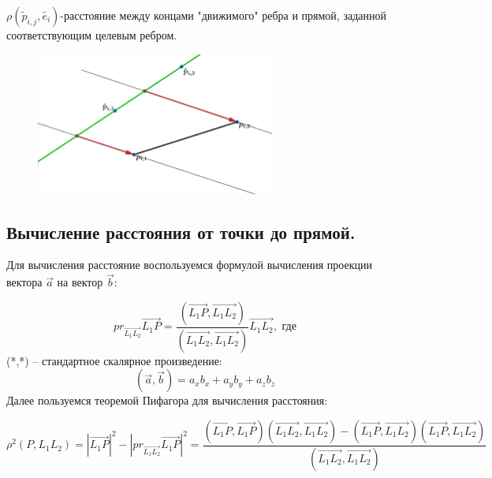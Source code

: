 \documentclass[14pt,fleqn,a4paper]{scrartcl}
\begin{document}
$\rho(\tilde p_{i,j},\widetilde{e_{i}})$-расстояние между концами "движимого" ребра и прямой, заданной соответствующим целевым ребром. 
\begin{figure}[htbp]
\centering
\includegraphics[width=0.7\textwidth]{distancce.png}
\end{figure}
\subsection{Вычисление расстояния от точки до прямой.}

Для вычисления расстояние воспользуемся формулой вычисления проекции вектора $\overrightarrow{a}$ на вектор $\overrightarrow{b}$: \\
\begin{figure} 
\end{figure}
$$pr_{\overrightarrow{L_{1}L_{2}}} \overrightarrow{L_{1}P}=\frac{( \overrightarrow{L_{1}P}, \overrightarrow{L_{1}L_{2}})}{ (\overrightarrow{L_{1}L_{2}}, \overrightarrow{L_{1}L_{2}})} \overrightarrow{L_{1}L_{2}},\text{ где}$$ (*,*) -- стандартное скалярное произведение:
$$( \overrightarrow{a}, \overrightarrow{b})=a_{x}b_{x}+a_{y}b_{y}+a_{z}b_{z}$$
Далее пользуемся теоремой Пифагора для вычисления расстояния:

$$\rho^{2}(P,L_1L_2)=|\overrightarrow{L_{1}P}|^{2}-|pr_{\overrightarrow{L_{1}L_{2}}} \overrightarrow{L_{1}P}|^{2}=\frac{(\overrightarrow{L_{1}P},\overrightarrow{L_{1}P})(\overrightarrow{L_{1}L_{2}},\overrightarrow{L_{1}L_{2}})-(\overrightarrow{L_{1}P},\overrightarrow{L_{1}L_{2}})(\overrightarrow{L_{1}P},\overrightarrow{L_{1}L_{2}})}{(\overrightarrow{L_{1}L_{2}},\overrightarrow{L_{1}L_{2}})}$$
\end{document}
